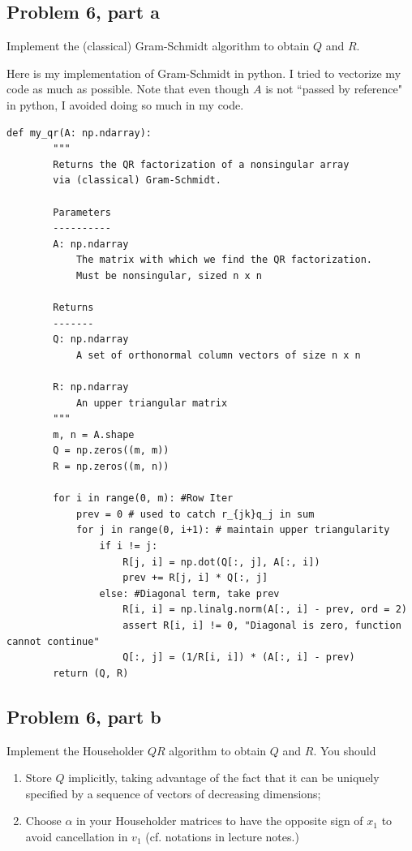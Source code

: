 \newpage
\subsection{Problem 6, part a}
Implement the (classical) Gram-Schmidt algorithm to obtain $Q$ and $R$.
\partbreak
\begin{solution}

    Here is my implementation of Gram-Schmidt in python. I tried to vectorize my code as much as possible. Note that even though $A$ is not ``passed by reference" in python, I avoided doing so much in my code.  

\begin{lstlisting}
def my_qr(A: np.ndarray):
        """
        Returns the QR factorization of a nonsingular array
        via (classical) Gram-Schmidt.

        Parameters
        ----------
        A: np.ndarray
            The matrix with which we find the QR factorization.
            Must be nonsingular, sized n x n

        Returns
        -------
        Q: np.ndarray
            A set of orthonormal column vectors of size n x n

        R: np.ndarray
            An upper triangular matrix
        """
        m, n = A.shape
        Q = np.zeros((m, m))
        R = np.zeros((m, n))

        for i in range(0, m): #Row Iter
            prev = 0 # used to catch r_{jk}q_j in sum
            for j in range(0, i+1): # maintain upper triangularity
                if i != j:
                    R[j, i] = np.dot(Q[:, j], A[:, i])
                    prev += R[j, i] * Q[:, j]
                else: #Diagonal term, take prev
                    R[i, i] = np.linalg.norm(A[:, i] - prev, ord = 2)
                    assert R[i, i] != 0, "Diagonal is zero, function cannot continue"
                    Q[:, j] = (1/R[i, i]) * (A[:, i] - prev)
        return (Q, R)
\end{lstlisting}
\end{solution}

\newpage
\subsection{Problem 6, part b}
Implement the Householder $QR$ algorithm to obtain $Q$ and $R$. You should 
\begin{enumerate}
    \item Store $Q$ implicitly, taking advantage of the fact that it can be uniquely specified by a sequence of vectors of decreasing dimensions;
    \item Choose $\alpha$ in your Householder matrices to have the opposite sign of $x_1$ to avoid cancellation in $v_1$ (cf. notations in lecture notes.)
\end{enumerate}
\partbreak


